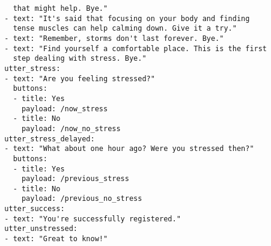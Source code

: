 \begin{lstlisting}
    that might help. Bye."
  - text: "It's said that focusing on your body and finding
    tense muscles can help calming down. Give it a try."
  - text: "Remember, storms don't last forever. Bye."
  - text: "Find yourself a comfortable place. This is the first
    step dealing with stress. Bye."
  utter_stress:
  - text: "Are you feeling stressed?"
    buttons:
    - title: Yes
      payload: /now_stress
    - title: No
      payload: /now_no_stress
  utter_stress_delayed:
  - text: "What about one hour ago? Were you stressed then?"
    buttons:
    - title: Yes
      payload: /previous_stress
    - title: No
      payload: /previous_no_stress
  utter_success:
  - text: "You're successfully registered."
  utter_unstressed:
  - text: "Great to know!"
\end{lstlisting}

\bigskip\bigskip
